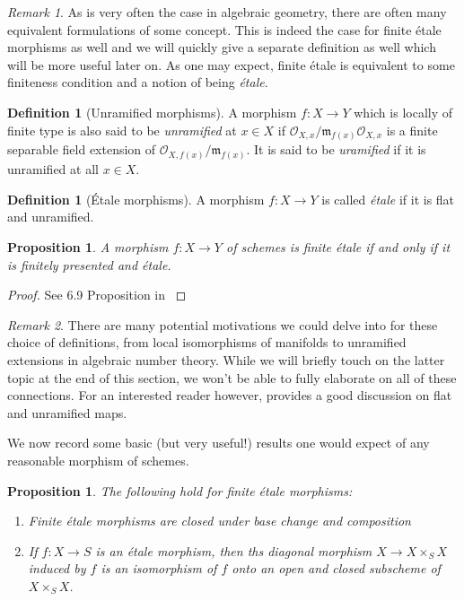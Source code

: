 \documentclass{article}
\theoremstyle{definition}
\newtheorem{definition2}[theorem]{Definition}
\theoremstyle{remark}
\newtheorem*{remark}{Remark}
\theoremstyle{plain}
\newtheorem{proposition}[theorem]{Proposition}
\newcommand{\mc}[1]{\mathcal{#1}}
\newcommand{\mk}[1]{\mathfrak{#1}}
\begin{document}
\begin{remark}
	As is very often the case in algebraic geometry, there are often many equivalent formulations of some concept.
	This is indeed the case for finite \'etale morphisms as well and we will quickly give a separate definition as well which will be more useful later on.
	As one may expect, finite \'etale is equivalent to some finiteness condition and a notion of being \textit{\'etale}.

\end{remark}

\begin{definition2}[Unramified morphisms]
	A morphism $f: X \to Y$ which is locally of finite type is also said to be \textit{unramified} at $x \in X$ if $\mc{O}_{X,x}/\mk{m}_{f(x)} \mc{O}_{X,x}$ is a finite separable field extension of $\mc{O}_{X, f(x)}/\mk{m}_{f(x)}$.
It is said to be \textit{uramified} if it is unramified at all $x \in X$.
\end{definition2}


\begin{definition2}[\'Etale morphisms]
	A morphism $f: X \to Y$ is called \textit{\'etale} if it is flat and unramified.
\end{definition2}

\begin{proposition}
	A morphism $f: X \to Y$ of schemes is finite \'etale if and only if it is finitely presented and \'etale.
\end{proposition}
\begin{proof}
	See 6.9 Proposition in \cite{Lenstra}
\end{proof}

\begin{remark}
	There are many potential motivations we could delve into for these choice of definitions, from local isomorphisms of manifolds to unramified extensions in algebraic number theory.
While we will briefly touch on the latter topic at the end of this section, we won't be able to fully elaborate on all of these connections.
For an interested reader however, \cite{milneLEC} provides a good discussion on flat and unramified maps. 
\end{remark}

We now record some basic (but very useful!) results one would expect of any reasonable morphism of schemes.

\begin{proposition}
The following hold for finite \'etale morphisms: 
\begin{enumerate}
	\item Finite \'etale morphisms are closed under base change and composition
	\item If $f: X \to S$ is an \'etale morphism, then ths diagonal morphism $X \to X \times_S X$ induced by $f$ is an isomorphism of $f$ onto an open and closed subscheme of $X \times_S X$.
\end{enumerate}
\end{proposition}
\end{document}
